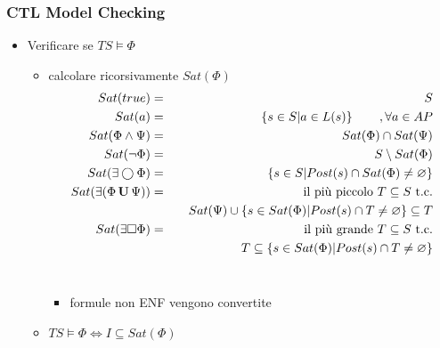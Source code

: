 \begin{frame}
  \frametitle{\acs{CTL} Model Checking}
  \begin{itemize}
  \item \alert{Verificare} se $TS\models\Phi$
    \begin{itemize}
    \item \alert{calcolare} ricorsivamente $Sat(\Phi)$\\[-7mm]
      \begin{eqnarray*}
        Sat(true)&=&S\\
        Sat(a)&=&\left\{s\in S| a\in L(s)\right\}\qquad,\forall a\in
        AP\\
        Sat(\Phi\land\Psi)&=&Sat(\Phi)\cap Sat(\Psi)\\
        Sat(\neg\Phi)&=&S\setminus Sat(\Phi)\\
        Sat(\exists\bigcirc\Phi)&=&\left\{s\in S|Post(s)\cap Sat(\Phi)\neq\varnothing\right\}\\
        Sat(\exists(\Phi\,\mathbf{U}\,\Psi))&=&\text{il pi\`u piccolo }T\subseteq
        S\text{ t.c.}\\
        &&\quad Sat(\Psi)\cup\left\{s\in Sat(\Phi)|Post(s)\cap
          T\neq\varnothing\right\}\subseteq T\\
        Sat(\exists\Box\Phi)&=&\text{il pi\`u grande }T\subseteq
        S\text{ t.c.}\\
        &&\quad T\subseteq\left\{s\in Sat(\Phi)|Post(s)\cap
          T\neq\varnothing\right\}
      \end{eqnarray*}\\[-4mm]
      \begin{itemize}
      \item formule non \acs{ENF} vengono \alert{convertite}
      \end{itemize}
    \item $TS\models\Phi \Leftrightarrow I\subseteq Sat(\Phi)$
    \end{itemize}
  \end{itemize}
\end{frame}

